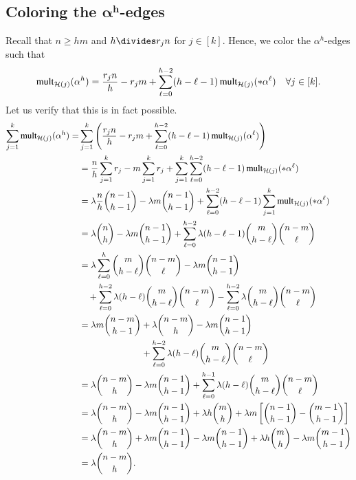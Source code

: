\documentclass[12pt,oneside]{amsart}
\newcommand\mult{\operatorname{\textup{{\fontfamily{ptm}\selectfont mult}}}}
\newcommand{\cc}{\mathcal}
\begin{document}
\subsection{Coloring the \texorpdfstring{$\bm{\alpha^{h}}$}{p}-edges} 
Recall that $n\geq h m$ and   $h\divides r_j n$ for $j\in [k]$. Hence, we color the $\alpha^{h}$-edges such that
\begin{align*}
    \mult_{\cc H(j)}(\alpha^h) = \frac{r_j n}{h} - r_j m + \sum_{\ell=0}^{h-2}(h-\ell-1)\mult_{\cc H(j)}(*\alpha^{\ell}) \quad \forall j\in[k].
\end{align*}
Let us verify that this is in fact possible. 
 \begin{align*}
     \sum_{j=1}^k\mult_{\cc H(j)}(\alpha^h) =& \sum_{j=1}^k\left(\frac{r_j n}{h} - r_j m + \sum_{\ell=0}^{h-2}(h-\ell-1)\mult_{\cc H(j)}( \alpha^{\ell})\right)\\
     &= \frac{n}{h}\sum_{j=1}^k r_j - m\sum_{j=1}^k r_j + \sum_{j=1}^k\sum_{\ell=0}^{h-2}(h-\ell-1)\mult_{\cc H(j)}(*\alpha^{\ell})\\
     &= \lambda\frac{n}{h}\binom{n-1}{h-1} - \lambda m\binom{n-1}{h-1} + \sum_{\ell=0}^{h-2}(h-\ell-1)\sum_{j=1}^k\mult_{\cc H(j)}(*\alpha^{\ell})\\
     &= \lambda\binom{n}{h} - \lambda m\binom{n-1}{h-1} + \sum_{\ell=0}^{h-2}\lambda(h-\ell-1)\binom{m}{h-\ell}\binom{n-m}{\ell}\\
     &= \lambda\sum_{\ell=0}^h\binom{m}{h-\ell}\binom{n-m}{\ell} - \lambda m\binom{n-1}{h-1} \\ 
     &\quad +\sum_{\ell=0}^{h-2}\lambda(h-\ell)\binom{m}{h-\ell}\binom{n-m}{\ell}- \sum_{\ell=0}^{h-2}\lambda\binom{m}{h-\ell}\binom{n-m}{\ell}\\
     &= \lambda m\binom{n-m}{h-1} + \lambda\binom{n-m}{h} - \lambda m\binom{n-1}{h-1} \\ 
     &\qquad\qquad\qquad\quad +\sum_{\ell=0}^{h-2}\lambda(h-\ell)\binom{m}{h-\ell}\binom{n-m}{\ell}\\
     &= \lambda\binom{n-m}{h} - \lambda m\binom{n-1}{h-1} + \sum_{\ell=0}^{h-1}\lambda(h-\ell)\binom{m}{h-\ell}\binom{n-m}{\ell}\\
     &= \lambda\binom{n-m}{h} - \lambda m\binom{n-1}{h-1} + \lambda h\binom{m}{h} + \lambda m\left[\binom{n-1}{h-1} - \binom{m-1}{h-1}\right]\\
     &= \lambda\binom{n-m}{h} + \lambda m\binom{n-1}{h-1} - \lambda m\binom{n-1}{h-1} + \lambda h\binom{m}{h} - \lambda m\binom{m-1}{h-1}\\
     &= \lambda\binom{n-m}{h}.
 \end{align*}
\end{document}
